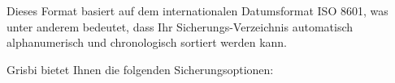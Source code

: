 \begin{itemize}
\begin{itemize}
	\end{itemize}
	Dieses Format basiert auf dem internationalen Datumsformat ISO 8601, was unter anderem bedeutet, dass Ihr Sicherungs-Verzeichnis automatisch alphanumerisch und chronologisch sortiert werden kann.
\end{itemize}

Grisbi bietet Ihnen die folgenden Sicherungsoptionen:

